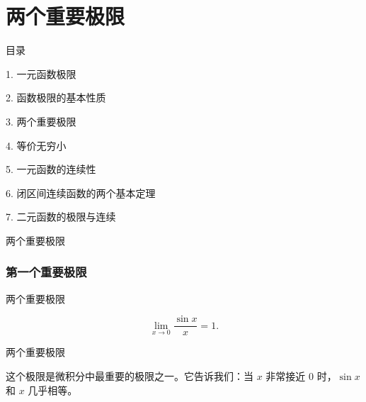 \documentclass[aspectratio=169,10pt,fontset=fandol]{ctexbeamer}
\begin{document}
\section{两个重要极限}
\begin{frame}[t,fragile]{目录}
\normalsize
{\color{black}\normalsize 1. 一元函数极限\par}\vspace{0.3em}
{\color{black}\normalsize 2. 函数极限的基本性质\par}\vspace{0.3em}
{\color{blue}\normalsize 3. 两个重要极限\par}\vspace{0.3em}
{\color{gray!40}\normalsize 4. 等价无穷小\par}\vspace{0.3em}
{\color{gray!40}\normalsize 5. 一元函数的连续性\par}\vspace{0.3em}
{\color{gray!40}\normalsize 6. 闭区间连续函数的两个基本定理\par}\vspace{0.3em}
{\color{gray!40}\normalsize 7. 二元函数的极限与连续\par}\vspace{0.3em}
\end{frame}
\begin{frame}[t,fragile]{两个重要极限}
\footnotesize
{\footnotesize
\subsubsection*{第一个重要极限}


}
\end{frame}
\begin{frame}[t,fragile]{两个重要极限}
\footnotesize
{\footnotesize
\[
\lim_{x \to 0} \frac{\sin x}{x} = 1.
\]


}
\end{frame}
\begin{frame}[t,fragile]{两个重要极限}
\footnotesize
{\footnotesize
这个极限是微积分中最重要的极限之一。它告诉我们：当 \(x\) 非常接近 0 时，\(\sin x\) 和 \(x\) 几乎相等。


}
\end{frame}
\end{document}
